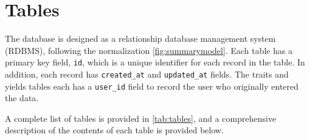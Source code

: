 \documentclass[10pt]{article}
\begin{document}
\section{Tables}\label{sec:tables}

 The database is designed as a relationship database management system (RDBMS), following the normalization \autoref{fig:summarymodel}.
 Each table has a primary key field, \verb+id+, which is a unique identifier for each record in the table.
 In addition, each record has \verb+created_at+ and \verb+updated_at+ fields.
 The traits and yields tables each has a \verb+user_id+ field to record the user who originally entered the data.
 
 A complete list of tables is provided in \autoref{tab:tables}, and a comprehensive description of the contents of each table is provided below.  
\end{document}

